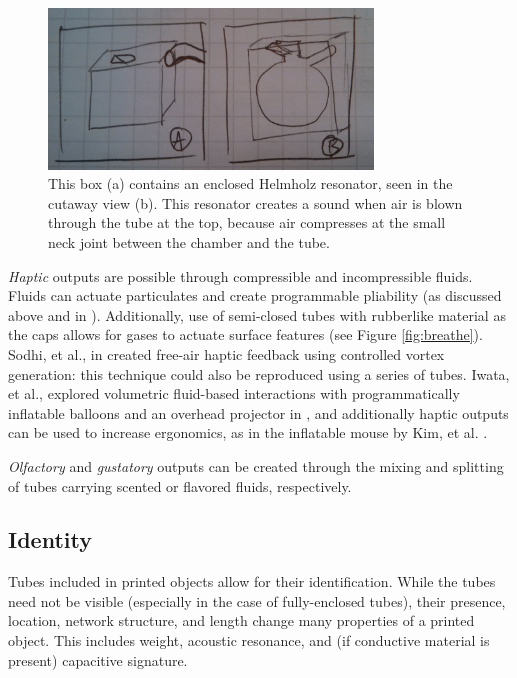 \begin{figure}[h]
\centering
    \includegraphics[width=3.4in]{figures/placeholder/helmholz.jpg}
\caption{This box (a) contains an enclosed Helmholz resonator, seen in the cutaway view (b).  This resonator creates a sound when air is blown through the tube at the top, because air compresses at the small neck joint between the chamber and the tube.  }
\label{fig:ocarina}
\end{figure}

\emph{Haptic} outputs are possible through compressible and incompressible fluids.  Fluids can actuate particulates and create programmable pliability (as discussed above and in \cite{Follmer-jamming}).  Additionally, use of semi-closed tubes with rubberlike material as the caps allows for gases to actuate surface features (see Figure \ref{fig:breathe}).  Sodhi, et al., in \cite{Sodhi-aireal} created free-air haptic feedback using controlled vortex generation: this technique could also be reproduced using a series of tubes.  Iwata, et al., explored volumetric fluid-based interactions with programmatically inflatable balloons and an overhead projector in \cite{Iwata-volflex}, and additionally haptic outputs can be used to increase ergonomics, as in the inflatable mouse by Kim, et al. \cite{Kim-inflatablemouse}.

\emph{Olfactory} and \emph{gustatory} outputs can be created through the mixing and splitting of tubes carrying scented or flavored fluids, respectively.

\subsection{Identity}

Tubes included in printed objects allow for their identification.  While the tubes need not be visible (especially in the case of fully-enclosed tubes), their presence, location, network structure, and length change many properties of a printed object.  This includes weight, acoustic resonance, and (if conductive material is present) capacitive signature.

